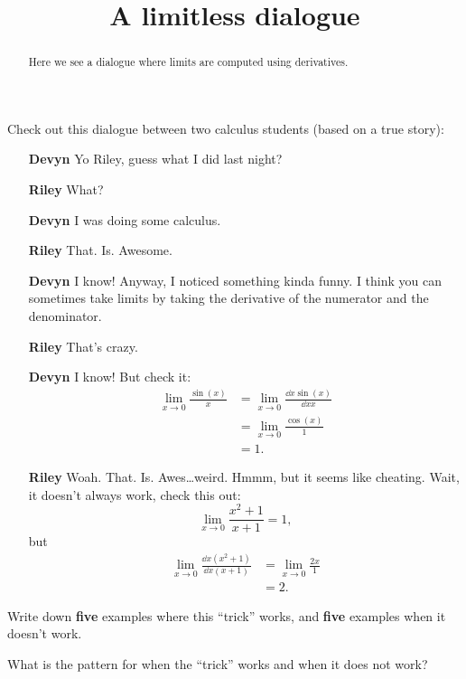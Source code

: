 \documentclass{ximera}
\title[Break-Ground:]{A limitless dialogue}
\begin{document}
\begin{abstract}
Here we see a dialogue where limits are computed using derivatives.
\end{abstract}
\maketitle

Check out this dialogue between two calculus students (based on a true
story):

\begin{itemize}
\item[\textbf{Devyn}] Yo Riley, guess what I did last night?
\item[\textbf{Riley}] What?
\item[\textbf{Devyn}] I was doing some calculus.
\item[\textbf{Riley}] That. Is. Awesome.
\item[\textbf{Devyn}] I know! Anyway, I noticed something kinda funny. I
  think you can sometimes take limits by taking the derivative of the
  numerator and the denominator.
\item[\textbf{Riley}] That's crazy.
\item[\textbf{Devyn}] I know! But check it:
  \begin{align*}
    \lim_{x\to 0} \frac{\sin(x)}{x} &= \lim_{x\to 0} \frac{\dd{x}\sin(x)}{\dd{x}x}\\
    &= \lim_{x\to 0} \frac{\cos(x)}{1}\\
    &=1.
  \end{align*}
  \item[\textbf{Riley}] Woah. That. Is. Awes\dots weird. Hmmm, but it seems like
    cheating. Wait, it doesn't always work, check this out:
    \[
    \lim_{x\to 0} \frac{x^2+1}{x+1} = 1,
    \]
    but
    \begin{align*}
      \lim_{x\to 0} \frac{\dd{x}\left(x^2+1\right)}{\dd{x}\left(x+1\right)} &=
      \lim_{x\to 0} \frac{2x}{1} \\
      &=2.
    \end{align*}
\end{itemize}

\begin{problem}
  Write down \textbf{five} examples where this ``trick'' works, and
  \textbf{five} examples when it doesn't work.
  \begin{freeResponse}
\end{freeResponse}
\end{problem}

\begin{problem}
  What is the pattern for when the ``trick'' works and when it does not work?
  \begin{freeResponse}
\end{freeResponse}
\end{problem}


\end{document}
